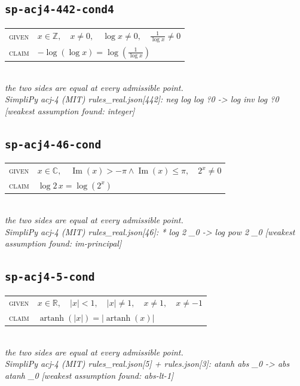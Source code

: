 \documentclass[11pt]{article}
\begin{document}
\subsection*{\texttt{sp-acj4-442-cond4}}
\begin{tabular}{@{}l@{\quad}l@{}}
\textsc{given} & $x \in \mathbb{Z},\quad x \neq 0,\quad \log x \neq 0,\quad \frac{1}{\log x} \neq 0$ \\[4pt]
\textsc{claim} & $\displaystyle -\log\left(\log x\right) = \log\left(\frac{1}{\log x}\right)$ \\
\end{tabular}\\[2pt]
{\small\emph{the two sides are equal at every admissible point.}}\\
\emph{SimpliPy acj-4 (MIT) rules\_real.json[442]: neg log log ?0  ->  log inv log ?0  [weakest assumption found: integer]}\\

\subsection*{\texttt{sp-acj4-46-cond}}
\begin{tabular}{@{}l@{\quad}l@{}}
\textsc{given} & $x \in \mathbb{C},\quad \operatorname{Im}\left(x\right) > -\pi \land \operatorname{Im}\left(x\right) \le \pi,\quad 2^{x} \neq 0$ \\[4pt]
\textsc{claim} & $\displaystyle \log 2 \, x = \log\left(2^{x}\right)$ \\
\end{tabular}\\[2pt]
{\small\emph{the two sides are equal at every admissible point.}}\\
\emph{SimpliPy acj-4 (MIT) rules\_real.json[46]: * log 2 \_0  ->  log pow 2 \_0  [weakest assumption found: im-principal]}\\

\subsection*{\texttt{sp-acj4-5-cond}}
\begin{tabular}{@{}l@{\quad}l@{}}
\textsc{given} & $x \in \mathbb{R},\quad \left|x\right| < 1,\quad \left|x\right| \neq 1,\quad x \neq 1,\quad x \neq -1$ \\[4pt]
\textsc{claim} & $\displaystyle \operatorname{artanh}\left(\left|x\right|\right) = \left|\operatorname{artanh}\left(x\right)\right|$ \\
\end{tabular}\\[2pt]
{\small\emph{the two sides are equal at every admissible point.}}\\
\emph{SimpliPy acj-4 (MIT) rules\_real.json[5] + rules.json[3]: atanh abs \_0  ->  abs atanh \_0  [weakest assumption found: abs-lt-1]}\\
\end{document}
